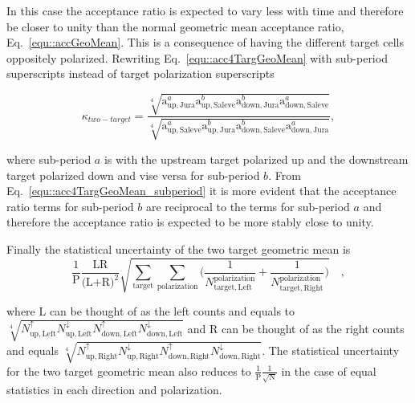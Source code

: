 \noindent
In this case the acceptance ratio is expected to vary less with time and
therefore be closer to unity than the normal geometric mean acceptance ratio,
Eq.~\ref{equ::accGeoMean}.  This is a consequence of having the different target
cells oppositely polarized.  Rewriting Eq.~\ref{equ::acc4TargGeoMean} with
sub-period superscripts instead of target polarization superscripts

\begin{equation}
  \label{equ::acc4TargGeoMean_subperiod}
  \kappa_{two-target} = \frac{
    \sqrt[4]{
      \mathrm{a}^{a}_{\mathrm{up,Jura}}
      \mathrm{a}^{b}_{\mathrm{up,Saleve}}
      \mathrm{a}^{b}_{\mathrm{down,Jura}}
      \mathrm{a}^{a}_{\mathrm{down,Saleve}}}
  }{
    \sqrt[4]{
      \mathrm{a}^{a}_{\mathrm{up,Saleve}}
      \mathrm{a}^{b}_{\mathrm{up,Jura}}
      \mathrm{a}^{b}_{\mathrm{down,Saleve}}
      \mathrm{a}^{a}_{\mathrm{down,Jura}}}
  },
\end{equation}

\noindent
where sub-period $a$ is with the upstream target polarized up and the downstream
target polarized down and vise versa for sub-period $b$.  From
Eq.~\ref{equ::acc4TargGeoMean_subperiod} it is more evident that the acceptance
ratio terms for sub-period $b$ are reciprocal to the terms for sub-period $a$
and therefore the acceptance ratio is expected to be more stably close to unity.

Finally the statistical uncertainty of the two target geometric mean is
\begin{equation}
  \frac{1}{\mathrm{P}}
  \frac{\text{LR}}{\Big( \text{L+R} \Big)^2}
  \sqrt{
    \sum_{\mathrm{target}}\sum_{\mathrm{polarization}}
    \Big(
    \frac{1}{N_{\mathrm{target,Left}}^{\mathrm{polarization}}}
    +
    \frac{1}{N_{\mathrm{target,Right}}^{\mathrm{polarization}}}
    \Big)
  } \quad,
\end{equation}

\noindent
where L can be thought of as the left counts and equals to
$\sqrt[4]{N_{\mathrm{up,Left}}^{\uparrow}N_{\mathrm{up,
      Left}}^{\downarrow}N_{\mathrm{down,Left}}^{\uparrow}N_{\mathrm{down,
      Left}}^{\downarrow}}$ and R can be thought of as the right counts and
equals $\sqrt[4]{N_{\mathrm{up,Right}}^{\uparrow}N_{\mathrm{up,
      Right}}^{\downarrow}N_{\mathrm{down,Right}}^{\uparrow}N_{\mathrm{down,
      Right}}^{\downarrow}}$.  The statistical uncertainty for the two target
geometric mean also reduces to $\frac{1}{\mathrm{P}}\frac{1}{\sqrt{\mathrm{N}}}$
in the case of equal statistics in each direction and polarization.


